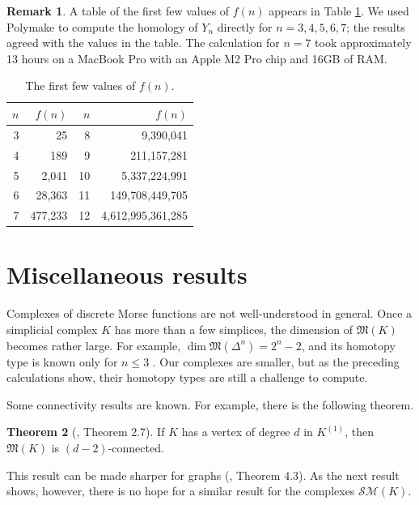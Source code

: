 \documentclass{amsart}
\theoremstyle{definition}
\newtheorem{theorem}{Theorem}[section]
\newtheorem{remark}[theorem]{Remark}
\newcommand{\sm}{{\mathcal{SM}}}
\begin{document}
\begin{remark}
    A table of the first few values of $f(n)$ appears in Table \ref{fntable}. We used Polymake to compute the homology of $Y_n$ directly for $n=3,4,5,6,7$; the results agreed with the values in the table. The calculation for $n=7$ took approximately 13 hours on a MacBook Pro with an Apple M2 Pro chip and 16GB of RAM.
\end{remark}

\begin{table}
\begingroup
\renewcommand{\arraystretch}{1.4}
\begin{tabular}{r|r|r|r}
\hline
$n$ & $f(n)$ & $n$ & $f(n)$ \\
\hline
3 & 25               & 8  & 9{,}390{,}041         \\
4 & 189              & 9  & 211{,}157{,}281        \\
5 & 2{,}041          & 10 & 5{,}337{,}224{,}991    \\
6 & 28{,}363         & 11 & 149{,}708{,}449{,}705  \\
7 & 477{,}233        & 12 & 4{,}612{,}995{,}361{,}285 \\
\hline
\end{tabular}
\endgroup
\caption{\label{fntable} The first few values of $f(n)$.}
\end{table}

\section{Miscellaneous results}\label{sec:misc} Complexes of discrete Morse functions are not well-understood in general. Once a simplicial complex $K$ has more than a few simplices, the dimension of ${\mathfrak M}(K)$ becomes rather large. For example, $\dim {\mathfrak M}(\Delta^n) = 2^n-2$, and its homotopy type is known only for $n\le 3$ \cite{Scoville2026}. Our complexes are smaller, but as the preceding calculations show, their homotopy types are still a challenge to compute.

Some connectivity results are known. For example, there is the following theorem.

\begin{theorem}[\cite{ScovilleZaremsky2022}, Theorem 2.7]
    If $K$ has a vertex of degree $d$ in $K^{(1)}$, then ${\mathfrak M}(K)$ is $(d-2)$-connected.
\end{theorem}

This result can be made sharper for graphs (\cite{ScovilleZaremsky2022}, Theorem 4.3). As the next result shows, however, there is no hope for a similar result for the complexes $\sm(K)$.
\end{document}
